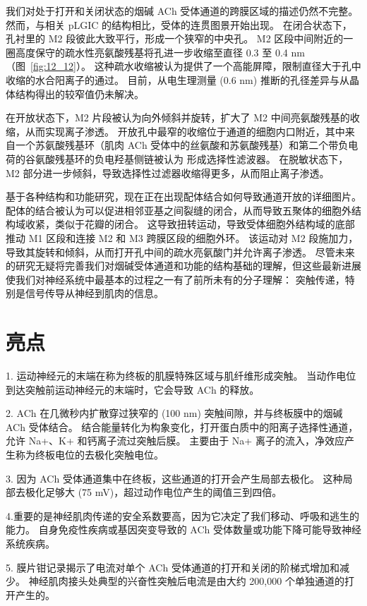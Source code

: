 我们对处于打开和关闭状态的烟碱 ACh 受体通道的跨膜区域的描述仍然不完整。
然而，与相关 pLGIC 的结构相比，受体的连贯图景开始出现。
在闭合状态下，孔衬里的 M2 段彼此大致平行，形成一个狭窄的中央孔。
M2 区段中间附近的一圈高度保守的疏水性亮氨酸残基将孔进一步收缩至直径 0.3 至 0.4 nm（图~\ref{fig:12_12}）。
这种疏水收缩被认为提供了一个高能屏障，限制直径大于孔中收缩的水合阳离子的通过。
目前，从电生理测量 (0.6 nm) 推断的孔径差异与从晶体结构得出的较窄值仍未解决。


在开放状态下，M2 片段被认为向外倾斜并旋转，扩大了 M2 中间亮氨酸残基的收缩，从而实现离子渗透。
开放孔中最窄的收缩位于通道的细胞内口附近，其中来自一个苏氨酸残基环（肌肉 ACh 受体中的丝氨酸和苏氨酸残基）和第二个带负电荷的谷氨酸残基环的负电羟基侧链被认为 形成选择性滤波器。
在脱敏状态下，M2 部分进一步倾斜，导致选择性过滤器收缩得更多，从而阻止离子渗透。


基于各种结构和功能研究，现在正在出现配体结合如何导致通道开放的详细图片。
配体的结合被认为可以促进相邻亚基之间裂缝的闭合，从而导致五聚体的细胞外结构域收紧，类似于花瓣的闭合。 
这导致扭转运动，导致受体细胞外结构域的底部推动 M1 区段和连接 M2 和 M3 跨膜区段的细胞外环。
该运动对 M2 段施加力，导致其旋转和倾斜，从而打开孔中间的疏水亮氨酸门并允许离子渗透。
尽管未来的研究无疑将完善我们对烟碱受体通道和功能的结构基础的理解，但这些最新进展使我们对神经系统中最基本的过程之一有了前所未有的分子理解：
突触传递，特别是信号传导从神经到肌肉的信息。



\section{亮点}

1. 运动神经元的末端在称为终板的肌膜特殊区域与肌纤维形成突触。
当动作电位到达突触前运动神经元的末端时，它会导致 ACh 的释放。 


2. ACh 在几微秒内扩散穿过狭窄的 (100 nm) 突触间隙，并与终板膜中的烟碱 ACh 受体结合。
结合能量转化为构象变化，打开蛋白质中的阳离子选择性通道，允许 Na+、K+ 和钙离子流过突触后膜。
主要由于 Na+ 离子的流入，净效应产生称为终板电位的去极化突触电位。 


3. 因为 ACh 受体通道集中在终板，这些通道的打开会产生局部去极化。
这种局部去极化足够大 (75 mV)，超过动作电位产生的阈值三到四倍。 


4.重要的是神经肌肉传递的安全系数要高，因为它决定了我们移动、呼吸和逃生的能力。
自身免疫性疾病或基因突变导致的 ACh 受体数量或功能下降可能导致神经系统疾病。 


5. 膜片钳记录揭示了电流对单个 ACh 受体通道的打开和关闭的阶梯式增加和减少。
神经肌肉接头处典型的兴奋性突触后电流是由大约 200,000 个单独通道的打开产生的。 


